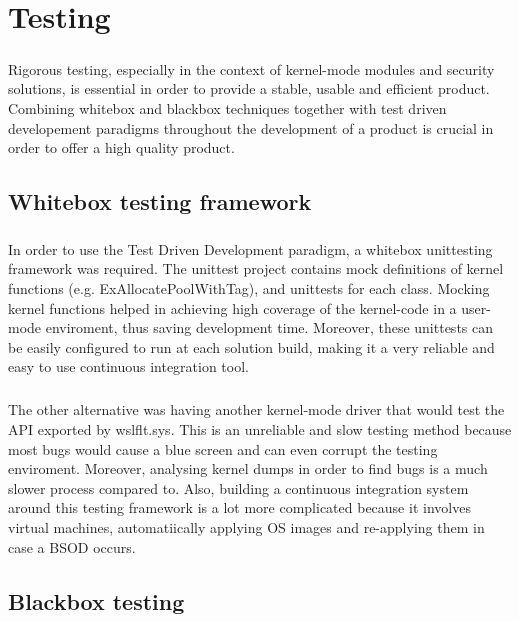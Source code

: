 \chapter{Testing}
    \paragraph{}
    Rigorous testing, especially in the context of kernel-mode modules and security solutions, is essential in order to provide a stable,
    usable and efficient product. Combining whitebox and blackbox techniques together with test driven developement paradigms throughout
    the development of a product is crucial in order to offer a high quality product.
    \section{Whitebox testing framework}
        \paragraph{}
        In order to use the Test Driven Development paradigm, a whitebox unittesting framework was required. The unittest project contains
        mock definitions of kernel functions (e.g. ExAllocatePoolWithTag), and unittests for each class. Mocking kernel functions helped in
        achieving high coverage of the kernel-code in a user-mode enviroment, thus saving development time. Moreover, these unittests can be
        easily configured to run at each solution build, making it a very reliable and easy to use continuous integration tool.
        \paragraph{}
        The other alternative was having another kernel-mode driver that would test the API exported by wslflt.sys. This is an unreliable
        and slow testing method because most bugs would cause a blue screen and can even corrupt the testing enviroment. Moreover, analysing
        kernel dumps in order to find bugs is a much slower process compared to. Also, building a continuous integration system around this
        testing framework is a lot more complicated because it involves virtual machines, automatiically applying OS images and re-applying them
        in case a BSOD occurs.
    \section{Blackbox testing}
